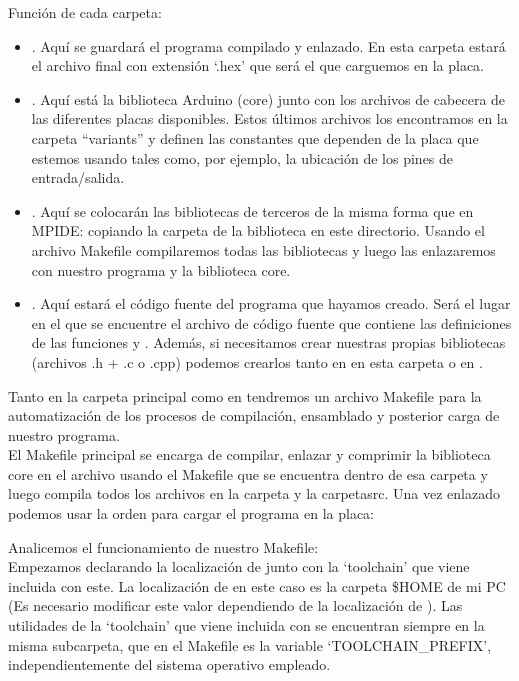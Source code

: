 Función de cada carpeta:
\begin{itemize}
	\item {}. Aquí se guardará el programa compilado y enlazado. En esta carpeta estará el archivo final con extensión `.hex' que será el que carguemos en la placa.
	\item {}. Aquí está la biblioteca Arduino (core) junto con los archivos de cabecera de las diferentes placas disponibles. Estos últimos archivos los encontramos en la carpeta ``variants'' y definen las constantes que dependen de la placa que estemos usando tales como, por ejemplo, la ubicación de los pines de entrada/salida.
	\item {}. Aquí se colocarán las bibliotecas de terceros de la misma forma que en MPIDE: copiando la carpeta de la biblioteca en este directorio. Usando el archivo Makefile compilaremos todas las bibliotecas y luego las enlazaremos con nuestro programa y la biblioteca core.
	\item {}. Aquí estará el código fuente del programa que hayamos creado. Será el lugar en el que se encuentre el archivo de código fuente  que contiene las definiciones de las funciones  y . Además, si necesitamos crear nuestras propias bibliotecas (archivos .h + .c o .cpp) podemos crearlos tanto en en esta carpeta o en .
\end{itemize}
Tanto en la carpeta principal como en  tendremos un archivo Makefile para la automatización de los procesos de compilación, ensamblado y posterior carga de nuestro programa.\\
El Makefile principal se encarga de compilar, enlazar y comprimir la biblioteca core en el archivo  usando el Makefile que se encuentra dentro de esa carpeta y luego compila todos los archivos en la carpeta  y la carpeta{src}. Una vez enlazado podemos usar la orden  para cargar el programa en la placa:
\newpage

\newpage
Analicemos el funcionamiento de nuestro Makefile:\\

Empezamos declarando la localización de  junto con la `toolchain' que viene incluida con este. La localización de  en este caso es la carpeta \$HOME de mi PC (Es necesario modificar este valor dependiendo de la localización de ). Las utilidades de la `toolchain' que viene incluida con  se encuentran siempre en la misma subcarpeta, que en el Makefile es la variable `TOOLCHAIN\_PREFIX', independientemente del sistema operativo empleado.\\

